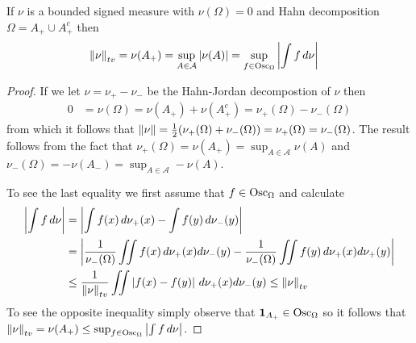 \begin{prop}\label{TotalVariationNormAlternativeFormulasCenteredMeasures}If $\nu$ is a bounded signed measure with $\nu(\Omega) = 0$ and Hahn decomposition $\Omega = A_+ \cup A_+^c$ then 
\begin{align*}
\left \lVert  \nu \right \rVert_{tv} &= \nu(A_+) = \sup_{A \in \mathcal{A}} \left \vert \nu(A) \right \vert = \sup_{f \in \operatorname*{Osc}_{\Omega}} \left \vert \int f \, d\nu \right \vert
\end{align*}
\end{prop}
\begin{proof}
If we let $\nu = \nu_+ - \nu_-$ be the Hahn-Jordan decompostion of $\nu$ then 
\begin{align*}
0 &= \nu(\Omega) = \nu(A_+) + \nu(A_+^c) = \nu_+(\Omega) - \nu_-(\Omega) 
\end{align*}
from which it follows that $\left \lVert \nu \right \rVert = \frac{1}{2}(\nu_+(\Omega) + \nu_-(\Omega)) = \nu_+(\Omega) = \nu_-(\Omega)$.  The result follows from the fact that $\nu_+(\Omega) = \nu(A_+) = \sup_{A \in \mathcal{A}} \nu(A)$ and $\nu_-(\Omega) = -\nu(A_-) = \sup_{A \in \mathcal{A}} -\nu(A)$.

To see the last equality we first assume that $f \in \operatorname*{Osc}_{\Omega}$ and calculate
\begin{align*}
\left \vert \int f \, d\nu \right \vert &= \left \vert \int f(x) \, d\nu_+(x) - \int f(y) \, d\nu_-(y) \right \vert \\
&= \left \vert \frac{1}{\nu_-(\Omega)} \iint f(x) \, d\nu_+(x) d\nu_-(y) - \frac{1}{\nu_-(\Omega)}\iint f(y) \, d \nu_+(x) d\nu_+(y) \right \vert \\
&\leq \frac{1}{\left \lVert  \nu \right \rVert_{tv}} \iint \left \vert  f(x) - f(y)  \right \vert \, d\nu_+(x) d\nu_-(y)  \leq \left \lVert  \nu \right \rVert_{tv} \\
\end{align*}
To see the opposite inequality simply observe that $\textbf{1}_{A_+} \in \operatorname*{Osc}_{\Omega}$ so it follows that $\left \lVert  \nu \right \rVert_{tv}  = \nu(A_+) \leq \sup_{f \in \operatorname*{Osc}_{\Omega}} \left \vert \int f \, d\nu \right \vert$.
\end{proof}

